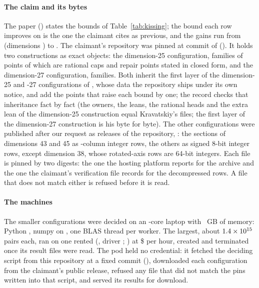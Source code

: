 \documentclass[preprint,11pt,authoryear,a4paper]{elsarticle}
\begin{document}
\paragraph{The claim and its bytes} The paper \citep{Yang26} (\QkPaperVersion) states the \MtKwRows{} bounds of Table~\ref{tab:kissing}; the bound each row improves on is the one the claimant cites as previous, and the gains run from \QkSmallestGain{} (dimensions \QkByOne) to \QkLargestGain. The claimant's repository \citep{QiushiRelease} was pinned at commit \texttt{\QkRepoCommit} of \QkRepoCommitDate{} (\QkLicence). It holds two constructions as exact objects: the dimension-25 configuration, \QkDTwentyFiveFamilies{} families of points of which \QkDTwentyFiveObjectRows{} are rational caps and repair points stated in closed form, and the dimension-27 configuration, \QkDTwentySevenFamilies{} families. Both inherit the first layer of the dimension-25 and -27 configurations of \citet{Kravatskiy26}, whose data the repository ships under its own notice, and add the points that raise each bound by one; the record checks that inheritance fact by fact (the owners, the leans, the rational heads and the extra lean of the dimension-25 construction equal Kravatskiy's files; the first layer of the dimension-27 construction is his byte for byte). The other \MtKwFromReleases{} configurations were published after our request as \MtKwReleases{} releases of the repository, \QkReleasesProse: the sections of dimensions 43 and 45 as \QkSectionColumns-column integer rows, the others as signed 8-bit integer rows, except dimension 38, whose \MtKwAxisRows{} rotated-axis rows are 64-bit integers. Each file is pinned by two digests: the one the hosting platform reports for the archive and the one the claimant's verification file records for the decompressed rows. A file that does not match either is refused before it is read.

\paragraph{The machines} The \MtKwDeskRows{} smaller configurations were decided on an \MtDeskCpus-core laptop with \MtDeskMemory~GB of memory: Python \QkDeskPython, numpy \QkDeskNumpy{} on \QkDeskBlas, one BLAS thread per worker. The \MtKwGpuRows{} largest, about $1.4\times10^{15}$ pairs each, ran on one rented \MtKwGpuName{} (\QkGpuMemory, driver \QkGpuDriver; \QkGpuSoftware) at \$\MtKwGpuPrice{} per hour, created \QkGpuCreated{} and terminated once its result files were read. The pod held no credential: it fetched the deciding script from this repository at a fixed commit (\texttt{\QkGpuAuditCommit}), downloaded each configuration from the claimant's public release, refused any file that did not match the pins written into that script, and served its results for download.
\end{document}
